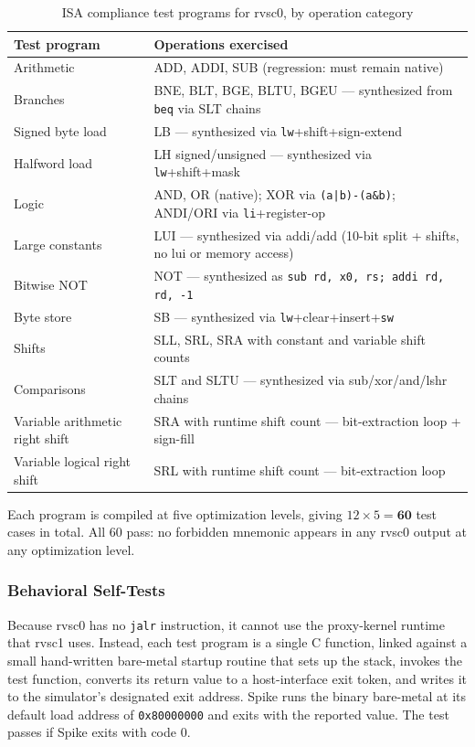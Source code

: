 \begin{table}[htb]
\centering
\caption{ISA compliance test programs for rvsc0, by operation category}
\label{tab:sc0-isa-files}
\begin{tabular}{p{3.0cm}p{11.5cm}}
\toprule
\textbf{Test program} & \textbf{Operations exercised} \\
\midrule
Arithmetic    & ADD, ADDI, SUB (regression: must remain native) \\
Branches      & BNE, BLT, BGE, BLTU, BGEU --- synthesized from \texttt{beq} via SLT chains \\
Signed byte load & LB --- synthesized via \texttt{lw}+shift+sign-extend \\
Halfword load & LH signed/unsigned --- synthesized via \texttt{lw}+shift+mask \\
Logic         & AND, OR (native); XOR via \texttt{(a|b)-(a\&b)}; ANDI/ORI via \texttt{li}+register-op \\
Large constants & LUI --- synthesized via addi/add (10-bit split + shifts, no lui or memory access) \\
Bitwise NOT   & NOT --- synthesized as \texttt{sub rd, x0, rs; addi rd, rd, -1} \\
Byte store    & SB --- synthesized via \texttt{lw}+clear+insert+\texttt{sw} \\
Shifts        & SLL, SRL, SRA with constant and variable shift counts \\
Comparisons   & SLT and SLTU --- synthesized via sub/xor/and/lshr chains \\
Variable arithmetic right shift & SRA with runtime shift count --- bit-extraction loop + sign-fill \\
Variable logical right shift & SRL with runtime shift count --- bit-extraction loop \\
\bottomrule
\end{tabular}
\end{table}

Each program is compiled at five optimization levels, giving $12 \times 5 = \mathbf{60}$ test cases
in total. All 60 pass: no forbidden mnemonic appears in any rvsc0 output at any optimization level.

\subsubsection{Behavioral Self-Tests} \label{sec:sc0-behav-tests}

Because rvsc0 has no \texttt{jalr} instruction, it cannot use the proxy-kernel runtime that rvsc1
uses. Instead, each test program is a single C function, linked against a small hand-written
bare-metal startup routine that sets up the stack, invokes the test function, converts its return
value to a host-interface exit token, and writes it to the simulator's designated exit address. Spike
runs the binary bare-metal at its default load address of \texttt{0x80000000} and exits with the
reported value. The test passes if Spike exits with code 0.

